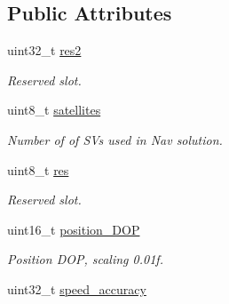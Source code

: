 \subsection*{Public Attributes}
\begin{DoxyCompactItemize}
\item 
\hypertarget{structubx__nav__solution__t_a01f323bab7b30d7190cf22fe00de2b0d}{uint32\+\_\+t \hyperlink{structubx__nav__solution__t_a01f323bab7b30d7190cf22fe00de2b0d}{res2}}\label{structubx__nav__solution__t_a01f323bab7b30d7190cf22fe00de2b0d}

\begin{DoxyCompactList}\small\item\em Reserved slot. \end{DoxyCompactList}\item 
\hypertarget{structubx__nav__solution__t_a079d9ea26437828dee37714b6ac07073}{uint8\+\_\+t \hyperlink{structubx__nav__solution__t_a079d9ea26437828dee37714b6ac07073}{satellites}}\label{structubx__nav__solution__t_a079d9ea26437828dee37714b6ac07073}

\begin{DoxyCompactList}\small\item\em Number of of S\+Vs used in Nav solution. \end{DoxyCompactList}\item 
\hypertarget{structubx__nav__solution__t_a7a91cfd79ced433fad3b8b145ec4f1da}{uint8\+\_\+t \hyperlink{structubx__nav__solution__t_a7a91cfd79ced433fad3b8b145ec4f1da}{res}}\label{structubx__nav__solution__t_a7a91cfd79ced433fad3b8b145ec4f1da}

\begin{DoxyCompactList}\small\item\em Reserved slot. \end{DoxyCompactList}\item 
\hypertarget{structubx__nav__solution__t_a8dd557cf38af7e62ab98872113628ccc}{uint16\+\_\+t \hyperlink{structubx__nav__solution__t_a8dd557cf38af7e62ab98872113628ccc}{position\+\_\+\+D\+O\+P}}\label{structubx__nav__solution__t_a8dd557cf38af7e62ab98872113628ccc}

\begin{DoxyCompactList}\small\item\em Position D\+O\+P, scaling 0.\+01f. \end{DoxyCompactList}\item 
\hypertarget{structubx__nav__solution__t_a8067fd4c0142f668d04ecb4513dcc16c}{uint32\+\_\+t \hyperlink{structubx__nav__solution__t_a8067fd4c0142f668d04ecb4513dcc16c}{speed\+\_\+accuracy}}\label{structubx__nav__solution__t_a8067fd4c0142f668d04ecb4513dcc16c}


\end{DoxyCompactItemize}
